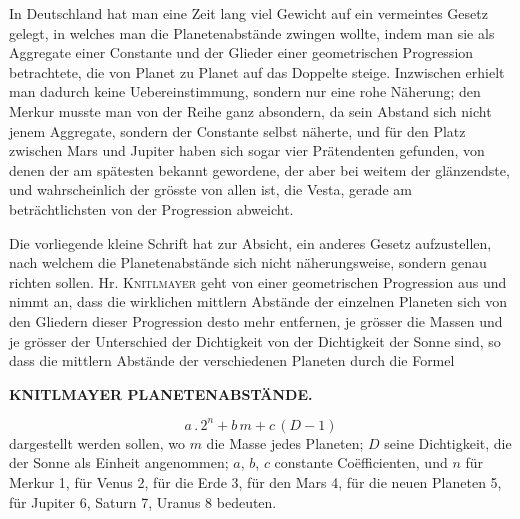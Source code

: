In Deutschland hat man eine Zeit lang viel Gewicht auf ein vermeintes Gesetz gelegt, in welches man die Planetenabstände zwingen wollte, indem man sie als Aggregate einer Constante und der Glieder einer geometrischen Progression betrachtete, die von Planet zu Planet auf das Doppelte steige. Inzwischen erhielt man dadurch keine Uebereinstimmung, sondern nur eine rohe Näherung; den Merkur musste man von der Reihe ganz absondern, da sein Abstand sich nicht jenem Aggregate, sondern der Constante selbst näherte, und für den Platz zwischen Mars und Jupiter haben sich sogar vier Prätendenten gefunden, von denen der am spätesten bekannt gewordene, der aber bei weitem der glänzendste, und wahrscheinlich der grösste von allen ist, die Vesta, gerade am beträchtlichsten von der Progression abweicht.

Die vorliegende kleine Schrift hat zur Absicht, ein anderes Gesetz aufzustellen, nach welchem die Planetenabstände sich nicht näherungsweise, sondern genau richten sollen. Hr. \textsc{Knitlmayer} geht von einer geometrischen Progression aus und nimmt an, dass die wirklichen mittlern Abstände der einzelnen Planeten sich von den Gliedern dieser Progression desto mehr entfernen, je grösser die Massen und je grösser der Unterschied der Dichtigkeit von der Dichtigkeit der Sonne sind, so dass die mittlern Abstände der verschiedenen Planeten durch die Formel
\par
\clearpage
{}
\noindent\makebox[10mm][l]{}%
\parbox[b]{\dimexpr\textwidth-20mm\relax}{\centering\small\textbf{KNITLMAYER PLANETENABSTÄNDE.}}%
\par\nobreak\medskip

\[ a \,.\, 2^n + b\,m + c\,(D - \mathrm{1}) \]
dargestellt werden sollen, wo $m$ die Masse jedes Planeten; $D$ seine Dichtigkeit, die der Sonne als Einheit angenommen; $a$, $b$, $c$ constante Coëfficienten, und $n$ für Merkur 1, für Venus 2, für die Erde 3, für den Mars 4, für die neuen Planeten 5, für Jupiter 6, Saturn 7, Uranus 8 bedeuten.

